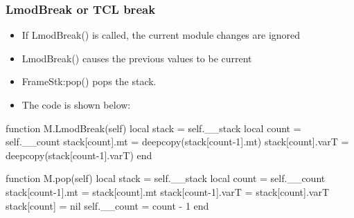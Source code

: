 \documentclass{beamer}
\begin{document}
\begin{frame}[fragile]
    \frametitle{LmodBreak or TCL break}
  \begin{itemize}
    \item If LmodBreak() is called, the current module changes are
      ignored
    \item LmodBreak() causes the previous values to be current
    \item FrameStk:pop() pops the stack.
    \item The code is shown below:
  \end{itemize}
 {\tiny
    \begin{semiverbatim}
function M.LmodBreak(self)
   local stack           = self.\_\_stack
   local count           = self.\_\_count
   stack[count].mt       = deepcopy(stack[count-1].mt)
   stack[count].varT     = deepcopy(stack[count-1].varT)
end

function M.pop(self)
   local stack           = self.\_\_stack
   local count           = self.\_\_count
   stack[count-1].mt     = stack[count].mt
   stack[count-1].varT   = stack[count].varT
   stack[count]          = nil
   self.__count          = count - 1
end
    \end{semiverbatim}
}
\end{frame}
\end{document}
